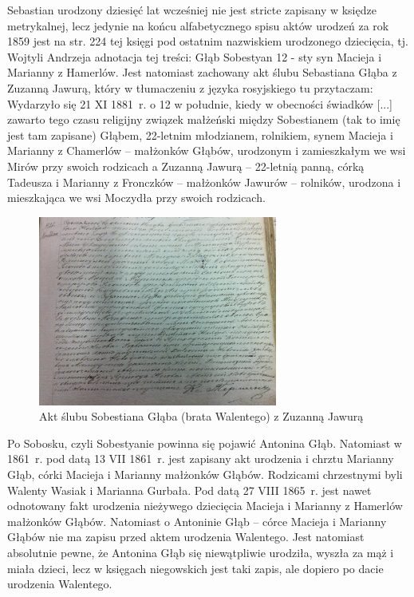 Sebastian urodzony dziesięć lat wcześniej nie jest stricte zapisany w księdze metrykalnej, lecz jedynie na końcu alfabetycznego spisu aktów urodzeń za rok 1859 jest na str. 224 tej księgi pod ostatnim nazwiskiem urodzonego dziecięcia, tj. Wojtyli Andrzeja adnotacja tej treści: Głąb Sobestyan 12 - sty syn Macieja i Marianny z Hamerlów. Jest natomiast zachowany akt ślubu Sebastiana Głąba z Zuzanną Jawurą, który w tłumaczeniu z języka rosyjskiego tu przytaczam: Wydarzyło się 21 XI 1881~r. o 12 w południe, kiedy w obecności świadków [...] zawarto tego czasu religijny związek małżeński między Sobestianem (tak to imię jest tam zapisane) Głąbem, 22-letnim młodzianem, rolnikiem, synem Macieja i Marianny z Chamerlów -- małżonków Głąbów, urodzonym i zamieszkałym we wsi Mirów przy swoich rodzicach a Zuzanną Jawurą -- 22-letnią panną, córką Tadeusza i Marianny z Fronczków -- małżonków Jawurów -- rolników, urodzona i mieszkająca we wsi Moczydła przy swoich rodzicach.

\begin{figure}[!h]
\begin{center}
\includegraphics[width=0.7\textwidth]{zdjecia/akt_slubu_sobestiana_glaba_i_zuzanny_jawury.jpg}
\caption[Akt ślubu Sobestiana Głąba z Zuzanną Jawurą]{Akt ślubu Sobestiana Głąba (brata Walentego) z Zuzanną Jawurą}
\label{rys:akt_slubu_sobestiana_glaba_i_zuzanny_jawury}
\end{center}
\end{figure}

Po Sobosku, czyli Sobestyanie powinna się pojawić Antonina Głąb. Natomiast w 1861~r. pod datą 13 VII 1861~r. jest zapisany akt urodzenia i chrztu Marianny Głąb, córki Macieja i Marianny małżonków Głąbów. Rodzicami chrzestnymi byli Walenty Wasiak i Marianna Gurbała. Pod datą 27 VIII 1865~r. jest nawet odnotowany fakt urodzenia nieżywego dziecięcia Macieja i Marianny z Hamerlów małżonków Głąbów. Natomiast o Antoninie Głąb -- córce Macieja i Marianny Głąbów nie ma zapisu przed aktem urodzenia Walentego. Jest natomiast absolutnie pewne, że Antonina Głąb się niewątpliwie urodziła, wyszła za mąż i miała dzieci, lecz w księgach niegowskich jest taki zapis, ale dopiero po dacie urodzenia Walentego.

